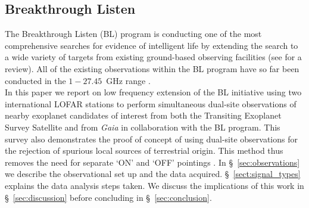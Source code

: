 \subsection{Breakthrough Listen}
The Breakthrough Listen (BL) program is conducting one of the most comprehensive searches for evidence of intelligent life by extending the search to a wide variety of targets from existing ground-based observing facilities (see \citealt{gsc+19} for a review). All of the existing observations within the BL program have so far been conducted in the $1-27.45$~GHz range \citep{Cherry_2022}. \\ 
In this paper we report on low frequency extension of the BL initiative using two international LOFAR stations to perform simultaneous dual-site observations of nearby exoplanet candidates of interest from both the Transiting Exoplanet Survey Satellite \citep[TESS;][]{TESS_2015} and from \textit{Gaia} \citep{Gaia_DR2_HR_2018} in collaboration with the BL program. This survey also demonstrates the proof of concept of using dual-site observations for the rejection of spurious local sources of terrestrial origin. This method thus removes the need for separate `ON' and `OFF' pointings \citep{Gajjar_2021_BLGC1}. In \S~\ref{sec:observations} we describe the observational set up and the data acquired. \S~\ref{sect:signal_types} explains the data analysis steps taken. We discuss the implications of this work in \S~\ref{sec:discussion} before concluding in \S~\ref{sec:conclusion}.
